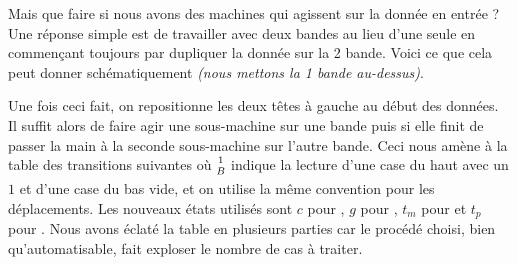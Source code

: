 Mais que faire si nous avons des machines qui agissent sur la donnée en entrée ?
Une réponse simple est de travailler avec deux bandes au lieu d'une seule en commençant toujours par dupliquer la donnée sur la 2\ieme{} bande.
Voici ce que cela peut donner schématiquement \emph{(nous mettons la 1\iere{} bande au-dessus)}.

\begin{multicols}{2}


\phantom{\emptybox\emptybox}%
	\deah

\emptybox\emptybox%
\emptybox\emptybox

\emptybox\emptybox%
	\emptybox\emptybox\emptybox%
\emptybox\emptybox

\phantom{\emptybox\emptybox}%
	\head


\medskip %

\phantom{\emptybox\emptybox\emptybox}%
	\deah

\emptybox\emptybox%
\emptybox\emptybox

\emptybox\emptybox%
	\emptybox\emptybox%
\emptybox\emptybox

\phantom{\emptybox\emptybox\emptybox}%
	\head


\medskip %

\phantom{\emptybox\emptybox\emptybox\emptybox}%
	\deah

\emptybox\emptybox%
\emptybox\emptybox

\emptybox\emptybox%
	\emptybox%
\emptybox\emptybox

\phantom{\emptybox\emptybox\emptybox\emptybox}%
	\head


\medskip %

\phantom{\emptybox\emptybox\emptybox\emptybox\emptybox}%
	\deah

\emptybox\emptybox%
\emptybox\emptybox

\emptybox\emptybox%
\emptybox\emptybox

\phantom{\emptybox\emptybox\emptybox\emptybox\emptybox}%
	\head

\end{multicols}


Une fois ceci fait, on repositionne les deux têtes à gauche au début des données.
Il suffit alors de faire agir une sous-machine sur une bande puis si elle finit de passer la main à la seconde sous-machine sur l'autre bande.
Ceci nous amène à la table des transitions suivantes où ${\scriptsize\begin{matrix}1\\B\end{matrix}}$ indique la lecture d'une case du haut avec un $1$ et d'une case du bas vide, et on utilise la même convention pour les déplacements.
Les nouveaux états utilisés sont
$c$ pour , 
$g$ pour ,
$t_m$ pour  et
$t_p$ pour .
Nous avons éclaté la table en plusieurs parties car le procédé choisi, bien qu'automatisable, fait exploser le nombre de cas à traiter.

